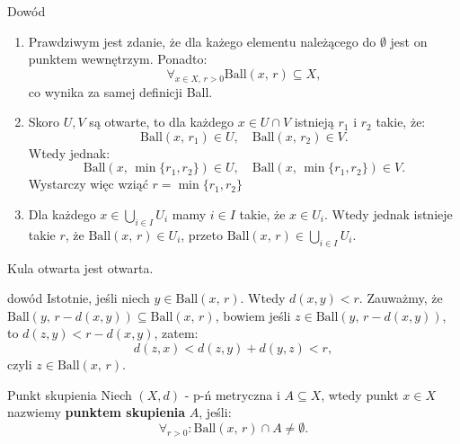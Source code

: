 \documentclass{article}
\newcounter{defi}
\numberwithin{defi}{section}
\numberwithin{theo}{section}
\numberwithin{defi}{section}
\newcommand{\ball}[2]{\text{Ball}(#1, \, #2)}
\begin{document}
\begin{dow}{Dowód}
    \begin{enumerate}
        \item Prawdziwym jest zdanie, że dla każego elementu należącego do $\emptyset$ jest on punktem wewnętrzym. Ponadto: \begin{equation}
                  \forall_{x \in X,\, r > 0} \ball{x}{r} \subseteq X,
              \end{equation}
              co wynika za samej definicji Ball.

        \item Skoro $U, V$ są otwarte, to dla każdego $x \in U \cap V$ istnieją $r_1$ i $r_2$ takie, że:\begin{equation*}
                  \ball{x}{r_1} \in U, \quad \ball{x}{r_2} \in V.
              \end{equation*} Wtedy jednak: \begin{equation*}
                  \ball{x}{\min\{r_1, r_2\}} \in U, \quad \ball{x}{\min\{r_1, r_2\}} \in V.
              \end{equation*} Wystarczy więc wziąć $r = \min\{r_1, r_2\}$

        \item Dla każdego $x \in \bigcup_{i \in I} U_i$ mamy $i \in I$ takie, że $x \in U_i$. Wtedy jednak istnieje takie $r$, że $\ball{x}{r} \in U_i$, przeto $\ball{x}{r} \in \bigcup_{i \in I} U_i$.

    \end{enumerate}

\end{dow}

\begin{twier}{}
    Kula otwarta jest otwarta.
\end{twier}

\begin{dow}{dowód}
    Istotnie, jeśli niech $y \in \ball{x}{r}$. Wtedy $d(x, y) < r$. Zauważmy, że $\ball{y}{r - d(x, y)} \subseteq \ball{x}{r}$, bowiem jeśli $z \in \ball{y}{r - d(x, y)}$, to $d(z, y) < r - d(x, y)$, zatem: \begin{equation*}
        d(z, x) < d(z, y) + d(y, z) < r,
    \end{equation*} czyli $z \in \ball{x}{r}$.
\end{dow}



\begin{defr}{Punkt skupienia}
    Niech $(X, d)$ - p-ń metryczna i $A \subseteq X$, wtedy punkt $x \in X$ nazwiemy \textbf{punktem skupienia} $A$, jeśli: \begin{equation}
        \forall_{r>0}: \ball{x}{r} \cap A \neq \emptyset.
    \end{equation}
\end{defr}
\end{document}
